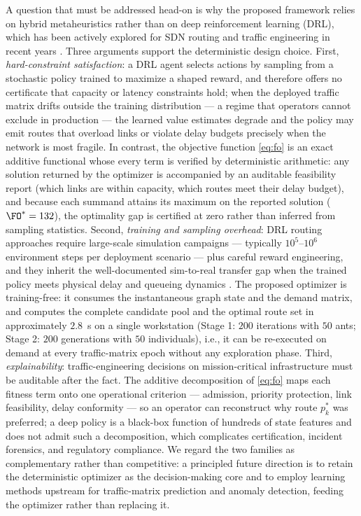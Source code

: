 A question that must be addressed head-on is why the proposed framework relies
on hybrid metaheuristics rather than on deep reinforcement learning (DRL),
which has been actively explored for SDN routing and traffic engineering in
recent years \cite{xu2018experience,stampa2017drl,almasan2022drl}. Three
arguments support the deterministic design choice. First,
\emph{hard-constraint satisfaction}: a DRL agent selects actions by sampling
from a stochastic policy trained to maximize a shaped reward, and therefore
offers no certificate that capacity or latency constraints hold; when the
deployed traffic matrix drifts outside the training distribution --- a regime
that operators cannot exclude in production --- the learned value estimates
degrade and the policy may emit routes that overload links or violate delay
budgets precisely when the network is most fragile. In contrast, the objective
function \eqref{eq:fo} is an exact additive functional whose every term is
verified by deterministic arithmetic: any solution returned by the optimizer
is accompanied by an auditable feasibility report (which links are within
capacity, which routes meet their delay budget), and because each summand
attains its maximum on the reported solution ($\FO^{*} = 132$), the optimality
gap is certified at zero rather than inferred from sampling statistics.
Second, \emph{training and sampling overhead}: DRL routing approaches require
large-scale simulation campaigns --- typically $10^{5}$--$10^{6}$ environment
steps per deployment scenario --- plus careful reward engineering, and they
inherit the well-documented sim-to-real transfer gap when the trained policy
meets physical delay and queueing dynamics \cite{almasan2022drl}. The proposed
optimizer is training-free: it consumes the instantaneous graph state and the
demand matrix, and computes the complete candidate pool and the optimal route
set in approximately $2.8$~s on a single workstation (Stage 1: $200$
iterations with $50$ ants; Stage 2: $200$ generations with $50$ individuals),
i.e., it can be re-executed on demand at every traffic-matrix epoch without
any exploration phase. Third, \emph{explainability}: traffic-engineering
decisions on mission-critical infrastructure must be auditable after the
fact. The additive decomposition of \eqref{eq:fo} maps each fitness term onto
one operational criterion --- admission, priority protection, link
feasibility, delay conformity --- so an operator can reconstruct why route
$p^{*}_k$ was preferred; a deep policy is a black-box function of hundreds of
state features and does not admit such a decomposition, which complicates
certification, incident forensics, and regulatory compliance. We regard the
two families as complementary rather than competitive: a principled future
direction is to retain the deterministic optimizer as the decision-making core
and to employ learning methods upstream for traffic-matrix prediction and
anomaly detection, feeding the optimizer rather than replacing it.